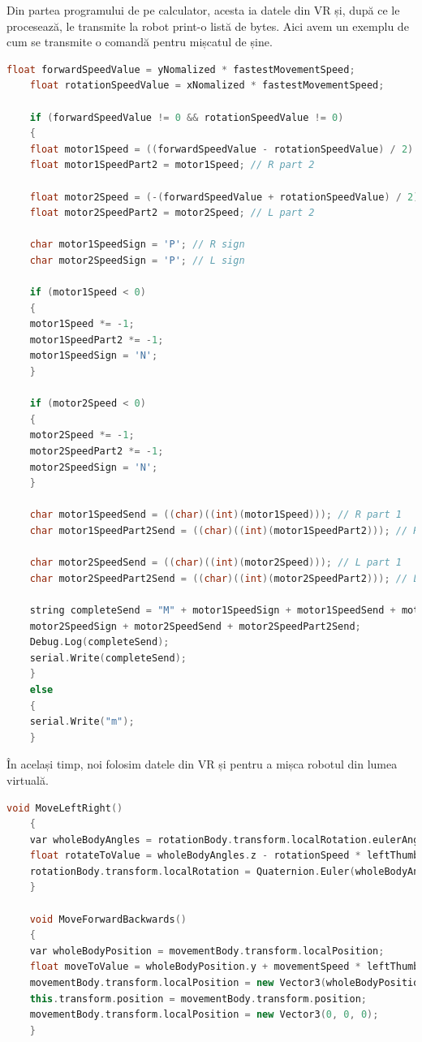 \documentclass[12pt,a4paper]{article}
\begin{document}
	\par Din partea programului de pe calculator, acesta ia datele din VR și, după ce le procesează, le transmite la robot print-o listă de bytes. Aici avem un exemplu de cum se transmite o comandă pentru mișcatul de șine.
	
	\begin{lstlisting}[language=C++, caption=Transmiterea datelor]
	float forwardSpeedValue = yNomalized * fastestMovementSpeed;
	float rotationSpeedValue = xNomalized * fastestMovementSpeed;
	
	if (forwardSpeedValue != 0 && rotationSpeedValue != 0)
	{
	float motor1Speed = ((forwardSpeedValue - rotationSpeedValue) / 2) * speedMultiplyer; // R part 1
	float motor1SpeedPart2 = motor1Speed; // R part 2
	
	float motor2Speed = (-(forwardSpeedValue + rotationSpeedValue) / 2) * speedMultiplyer; // L part 1
	float motor2SpeedPart2 = motor2Speed; // L part 2
	
	char motor1SpeedSign = 'P'; // R sign
	char motor2SpeedSign = 'P'; // L sign
	
	if (motor1Speed < 0)
	{
	motor1Speed *= -1;
	motor1SpeedPart2 *= -1;
	motor1SpeedSign = 'N';
	}
	
	if (motor2Speed < 0)
	{
	motor2Speed *= -1;
	motor2SpeedPart2 *= -1;
	motor2SpeedSign = 'N';
	}
	
	char motor1SpeedSend = ((char)((int)(motor1Speed))); // R part 1
	char motor1SpeedPart2Send = ((char)((int)(motor1SpeedPart2))); // R part 2
	
	char motor2SpeedSend = ((char)((int)(motor2Speed))); // L part 1
	char motor2SpeedPart2Send = ((char)((int)(motor2SpeedPart2))); // L part 2
	
	string completeSend = "M" + motor1SpeedSign + motor1SpeedSend + motor1SpeedPart2Send +
	motor2SpeedSign + motor2SpeedSend + motor2SpeedPart2Send;
	Debug.Log(completeSend);
	serial.Write(completeSend);
	}
	else
	{
	serial.Write("m");
	}
	\end{lstlisting}
	
	\par În același timp, noi folosim datele din VR și pentru a mișca robotul din lumea virtuală.
	
	\begin{lstlisting}[language=C++, caption=Mișcarea robotului virtual]
	void MoveLeftRight()
	{
	var wholeBodyAngles = rotationBody.transform.localRotation.eulerAngles;
	float rotateToValue = wholeBodyAngles.z - rotationSpeed * leftThumbstickLeftRight;
	rotationBody.transform.localRotation = Quaternion.Euler(wholeBodyAngles.x, wholeBodyAngles.y, rotateToValue);
	}
	
	void MoveForwardBackwards()
	{
	var wholeBodyPosition = movementBody.transform.localPosition;
	float moveToValue = wholeBodyPosition.y + movementSpeed * leftThumbstickUpDown;
	movementBody.transform.localPosition = new Vector3(wholeBodyPosition.x, moveToValue, wholeBodyPosition.z);
	this.transform.position = movementBody.transform.position;
	movementBody.transform.localPosition = new Vector3(0, 0, 0);
	}
	\end{lstlisting}
	
\end{document}
